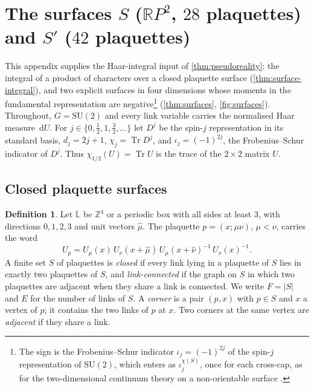 \documentclass[11pt,a4paper]{amsart}
\theoremstyle{definition}
\newtheorem{definition}[theorem]{Definition}
\theoremstyle{remark}
\numberwithin{equation}{section}
\DeclareMathOperator{\Tr}{Tr}        %
\newcommand{\Z}{\mathbb{Z}}          %
\newcommand{\abs}[1]{\lvert #1\rvert}      %
\newcommand{\dd}{\,\mathrm{d}}             %
\newcommand{\SU}{\mathrm{SU}}              %
\begin{document}
\section{The surfaces $S$ ($\mathbb{R}P^2$, $28$ plaquettes) and $S'$ ($42$ plaquettes)}\label{app:surfaces}

This appendix supplies the Haar-integral input of \cref{thm:pseudoreality}: the integral of a product of characters over a closed plaquette surface (\cref{thm:surface-integral}), and two explicit surfaces in four dimensions whose moments in the fundamental representation are negative\footnote{The sign is the Frobenius--Schur indicator $\iota_j=(-1)^{2j}$ of the spin-$j$ representation of $\SU(2)$, which enters as $\iota_j^{\chi(S)}$, once for each cross-cap, as for the two-dimensional continuum theory on a non-orientable surface \cite{witten1991}.} (\cref{thm:surfaces}, \cref{fig:surfaces}). Throughout, $G=\SU(2)$ and every link variable carries the normalised Haar measure $\dd U$. For $j\in\{0,\frac12,1,\frac32,\dots\}$ let $D^j$ be the spin-$j$ representation in its standard basis, $d_j=2j+1$, $\chi_j=\Tr D^j$, and $\iota_j=(-1)^{2j}$, the Frobenius--Schur indicator of $D^j$. Thus $\chi_{1/2}(U)=\Tr U$ is the trace of the $2\times2$ matrix $U$.

\subsection{Closed plaquette surfaces}

\begin{definition}\label{def:closed-surface}
Let $\mathbb{L}$ be $\Z^4$ or a periodic box with all sides at least $3$, with directions $0,1,2,3$ and unit vectors $\hat\mu$. The plaquette $p=(x;\mu\nu)$, $\mu<\nu$, carries the word
\[
U_p=U_\mu(x)\,U_\nu(x+\hat\mu)\,U_\mu(x+\hat\nu)^{-1}\,U_\nu(x)^{-1}.
\]
A finite set $S$ of plaquettes is \emph{closed} if every link lying in a plaquette of $S$ lies in exactly two plaquettes of $S$, and \emph{link-connected} if the graph on $S$ in which two plaquettes are adjacent when they share a link is connected. We write $F=\abs{S}$ and $E$ for the number of links of $S$. A \emph{corner} is a pair $(p,x)$ with $p\in S$ and $x$ a vertex of $p$; it contains the two links of $p$ at $x$. Two corners at the same vertex are \emph{adjacent} if they share a link.
\end{definition}
\end{document}
